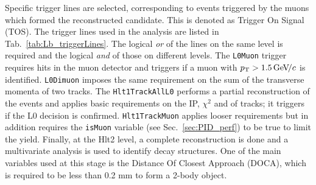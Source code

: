 Specific trigger lines are selected, corresponding to events triggered by the muons
which formed the reconstructed candidate. This is denoted as Trigger On Signal (TOS).
The trigger lines used in the analysis are listed in Tab.~\ref{tab:Lb_triggerLines}.
The logical {\em or } of the lines on the same level is required and the logical {\em and}
of those on different levels.
The \verb!L0Muon! trigger requires hits in the muon detector and triggers if a muon with $\mbox{$p_{\rm T}$} > 1.5 {\mathrm{\,Ge\kern -0.1em V\!/}c}$ is identified.
\verb!L0Dimuon! imposes the same requirement on the sum of the transverse momenta of two tracks.
The \verb!Hlt1TrackAllL0! performs a partial reconstruction of the events and applies basic requirements on the
IP, $\chi^2$ and \pt of tracks; it triggers if the L0 decision is confirmed. \verb!Hlt1TrackMuon! applies looser requirements 
but in addition requires the \verb!isMuon! variable (see Sec.~\ref{sec:PID_perf}) to be true to limit the yield.
Finally, at the Hlt2 level, a complete reconstruction is done and a multivariate analysis is used to identify decay 
structures. One of the main variables used at this stage is the Distance Of Closest Approach (DOCA), which is 
required to be less than 0.2 mm to form a 2-body object.
%
\begin{table}[h]
\centering
\caption{Summary of the trigger lines used to select events at various levels.
Trigger is always required to be due to the tracks of the candidate itself.}
\label{tab:Lb_triggerLines}
\end{table}
%


